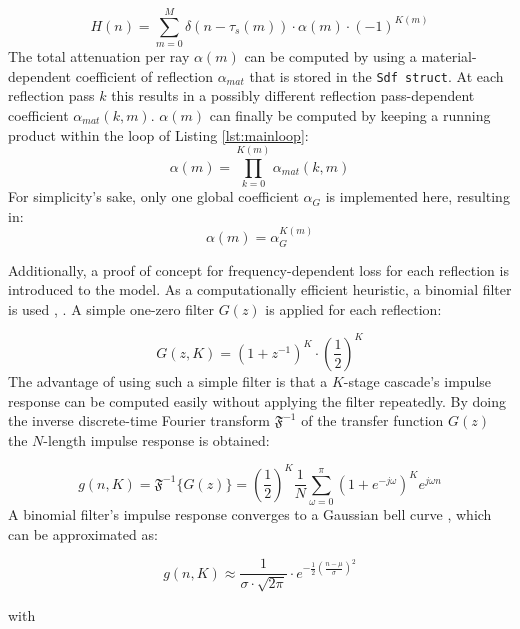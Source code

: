 \documentclass[twoside,a4paper]{article}
\begin{document}
\begin{equation}
H(n) = \sum_{m=0}^M \delta(n-\tau_s(m))\cdot \alpha(m)\cdot (-1)^{K(m)}
\end{equation}
The total attenuation per ray $\alpha(m)$ can be computed by using a material-dependent coefficient of reflection $\alpha_{mat}$ that is stored in the \texttt{Sdf struct}. At each reflection pass $k$ this results in a possibly different reflection pass-dependent coefficient $\alpha_{mat}(k,m)$. $\alpha(m)$ can finally be computed by keeping a running product within the loop of Listing \ref{lst:mainloop}:
\begin{equation}
\alpha(m)=\prod_{k=0}^{K(m)} \alpha_{mat}(k,m)
\end{equation}
For simplicity's sake, only one global coefficient $\alpha_G$ is implemented here, resulting in:
\begin{equation}
\alpha(m) = \alpha_G^{K(m)}
\end{equation}

Additionally, a proof of concept for frequency-dependent loss for each reflection is introduced to the model. As a computationally efficient heuristic, a binomial filter is used \cite{aubury_binomial_1996}, \cite{derpanis_overview_nodate}. A simple one-zero filter $G(z)$ is applied for each reflection:

\begin{equation}
G(z,K) = (1+z^{-1})^K \cdot \left(\frac{1}{2}\right)^K
\end{equation}
The advantage of using such a simple filter is that a $K$-stage cascade's impulse response can be computed easily without applying the filter repeatedly. By doing the inverse discrete-time Fourier transform $\mathfrak{F}^{-1}$ of the transfer function $G(z)$ the $N$-length impulse response is obtained:

\begin{equation}
  g(n,K) = \mathfrak{F}^{-1}\{ G(z) \} = \left(\frac{1}{2}\right)^K \frac{1}{N}  \sum_{\omega = 0}^\pi (1+e^{-j\omega})^{K} e^{j\omega n} 
\end{equation}
A binomial filter's impulse response converges to a Gaussian bell curve \cite{aubury_binomial_1996}, which can be approximated as:

\begin{equation}
g(n,K) \approx  \frac{1}{\sigma \cdot \sqrt{2 \pi}} \cdot e ^{-\frac{1}{2} (\frac{n-\mu}{\sigma})^2}
\label{eq:assump}
\end{equation}


with 
\end{document}
